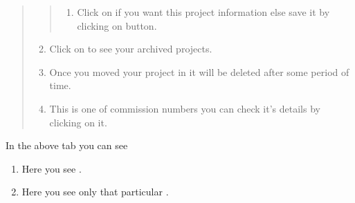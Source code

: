 \documentclass[letterpaper,10pt,english]{sphinxmanual}
\begin{document}
\begin{quote}
\begin{quote}
\begin{enumerate}
\item {} 
Click on  if you want  this project information else save it by clicking on  button.

\end{enumerate}
\end{quote}
\begin{enumerate}
\setcounter{enumi}{1}
\item {} 
Click on  to see your archived projects.

\item {} 
Once you moved your project in  it will be deleted after some period of time.

\item {} 
This is one of commission numbers you can check it’s details by clicking on it.

\end{enumerate}
\end{quote}

\begin{figure}[htbp]
\centering

\noindent{}
\end{figure}

In the above tab you can see
\begin{enumerate}
\item {} 
Here you see  .

\item {} 
Here you see only that particular  .

\end{enumerate}

\begin{figure}[htbp]
\centering

\noindent{}
\end{figure}
\end{document}
